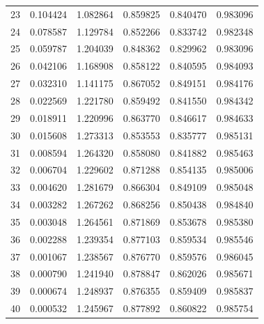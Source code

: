 \begin{table}[ht]
{\begin{tabular}{c c c c c c}
23 & 0.104424 & 1.082864 & 0.859825 & 0.840470 & 0.983096 \\
24 & 0.078587 & 1.129784 & 0.852266 & 0.833742 & 0.982348 \\
25 & 0.059787 & 1.204039 & 0.848362 & 0.829962 & 0.983096 \\
26 & 0.042106 & 1.168908 & 0.858122 & 0.840595 & 0.984093 \\
27 & 0.032310 & 1.141175 & 0.867052 & 0.849151 & 0.984176 \\
28 & 0.022569 & 1.221780 & 0.859492 & 0.841550 & 0.984342 \\
29 & 0.018911 & 1.220996 & 0.863770 & 0.846617 & 0.984633 \\
30 & 0.015608 & 1.273313 & 0.853553 & 0.835777 & 0.985131 \\
31 & 0.008594 & 1.264320 & 0.858080 & 0.841882 & 0.985463 \\
32 & 0.006704 & 1.229602 & 0.871288 & 0.854135 & 0.985006 \\
33 & 0.004620 & 1.281679 & 0.866304 & 0.849109 & 0.985048 \\
34 & 0.003282 & 1.267262 & 0.868256 & 0.850438 & 0.984840 \\
35 & 0.003048 & 1.264561 & 0.871869 & 0.853678 & 0.985380 \\
36 & 0.002288 & 1.239354 & 0.877103 & 0.859534 & 0.985546 \\
37 & 0.001067 & 1.238567 & 0.876770 & 0.859576 & 0.986045 \\
38 & 0.000790 & 1.241940 & 0.878847 & 0.862026 & 0.985671 \\
39 & 0.000674 & 1.248937 & 0.876355 & 0.859409 & 0.985837 \\
40 & 0.000532 & 1.245967 & 0.877892 & 0.860822 & 0.985754 \\
\hline
\end{tabular}
}
\end{table}


